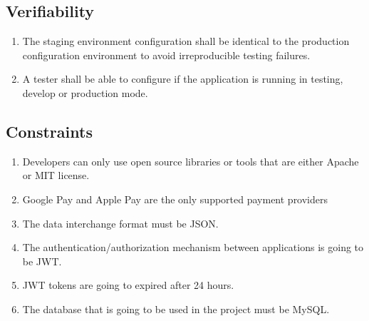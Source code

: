 \subsection{Verifiability}
\begin{enumerate}[label=VER-\arabic*]
    \item The staging environment configuration shall be identical to the 
    production configuration environment to avoid irreproducible 
    testing failures.
    \item A tester shall be able to configure if the application is 
    running in testing, develop or production mode.
\end{enumerate}
\pagebreak
\subsection{Constraints}
\begin{enumerate}[label=CON-\arabic*]
    \item Developers can only use open source libraries or tools that are 
    either Apache or MIT license.
    \item Google Pay and Apple Pay are the only supported payment providers
    \item The data interchange format must be JSON.
    \item The authentication/authorization mechanism between applications 
    is going to be JWT.
    \item JWT tokens are going to expired after 24 hours.
    \item The database that is going to be used in the project must be MySQL.
\end{enumerate}